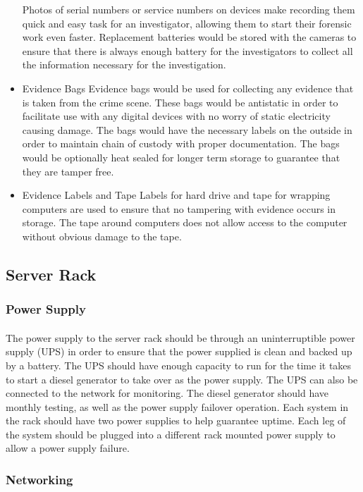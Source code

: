 \documentclass{article}
\begin{document}
\begin{itemize}
Photos of serial numbers or service numbers on devices make recording them quick and easy task for an investigator, allowing them to start their forensic work even faster. 
Replacement batteries would be stored with the cameras to ensure that there is always enough battery for the investigators to collect all the information necessary for the investigation.
\item
Evidence Bags
\subitem 
Evidence bags would be used for collecting any evidence that is taken from the crime scene.
These bags would be antistatic in order to facilitate use with any digital devices with no worry of static electricity causing damage. 
The bags would have the necessary labels on the outside in order to maintain chain of custody with proper documentation. 
The bags would be optionally heat sealed for longer term storage to guarantee that they are tamper free. 
\item 
Evidence Labels and Tape
\subitem 
Labels for hard drive and tape for wrapping computers are used to ensure that no tampering with evidence occurs in storage. 
The tape around computers does not allow access to the computer without obvious damage to the tape. 
\end{itemize} 

\subsection{Server Rack}
\subsubsection{Power Supply}
\paragraph{}
The power supply to the server rack should be through an uninterruptible power supply (UPS) in order to ensure that the power supplied is clean and backed up by a battery.
The UPS should have enough capacity to run for the time it takes to start a diesel generator to take over as the power supply.
The UPS can also be connected to the network for monitoring.  
The diesel generator should have monthly testing, as well as the power supply failover operation.
Each system in the rack should have two power supplies to help guarantee uptime.
Each leg of the system should be plugged into a different rack mounted power supply to allow a power supply failure.
 
\subsubsection{Networking}
\end{document}
